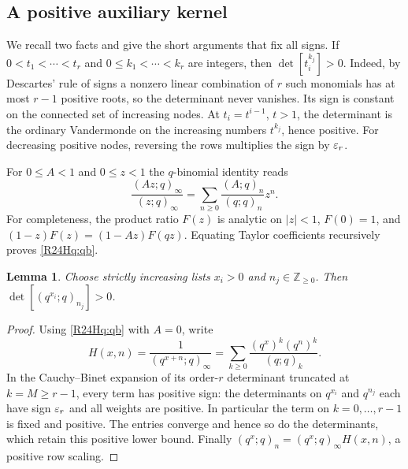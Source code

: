 \documentclass[11pt,a4paper]{article}
\newtheorem{SourceRceHqlemma}[SourceRceHqtheorem]{Lemma}
\begin{document}
\subsection{A positive auxiliary kernel}
We recall two facts and give the short arguments that fix all signs.
If $0<t_1<\cdots<t_r$ and $0\le k_1<\cdots<k_r$ are integers, then
$\det[t_i^{k_j}]>0$. Indeed, by Descartes' rule of signs a nonzero linear
combination of $r$ such monomials has at most $r-1$ positive roots, so
the determinant never vanishes. Its sign is constant on the connected
set of increasing nodes. At $t_i=t^{i-1}$, $t>1$, the determinant is the
ordinary Vandermonde on the increasing numbers $t^{k_j}$, hence positive.
For decreasing positive nodes, reversing the rows multiplies the sign by
$\varepsilon_r$.

For $0\le A<1$ and $0\le z<1$ the $q$-binomial identity reads
\begin{equation}\label{R24Hq:qb}
 \frac{(Az;q)_\infty}{(z;q)_\infty}
    =\sum_{n\ge0}\frac{(A;q)_n}{(q;q)_n}z^n .
\end{equation}
For completeness, the product ratio $F(z)$ is analytic on $|z|<1$,
$F(0)=1$, and $(1-z)F(z)=(1-Az)F(qz)$. Equating Taylor coefficients
recursively proves \eqref{R24Hq:qb}.

\begin{SourceRceHqlemma}\label{R24Hq:pos}
Choose strictly increasing lists $x_i>0$ and $n_j\in\mathbb Z_{\ge0}$. Then
$\det[(q^{x_i};q)_{n_j}]>0$.
\end{SourceRceHqlemma}
\begin{proof}
Using \eqref{R24Hq:qb} with $A=0$, write
\[
 H(x,n)=\frac{1}{(q^{x+n};q)_\infty}
 =\sum_{k\ge0}\frac{(q^x)^k(q^n)^k}{(q;q)_k}.
\]
In the Cauchy--Binet expansion of its order-$r$ determinant truncated at
$k=M\ge r-1$, every term has positive sign: the determinants on
$q^{x_i}$ and $q^{n_j}$ each have sign $\varepsilon_r$ and all weights are positive.
In particular the term on $k=0,\ldots,r-1$ is fixed and positive.
The entries converge and hence so do the determinants, which retain
this positive lower bound. Finally
$(q^x;q)_n=(q^x;q)_\infty H(x,n)$, a positive row scaling.
\end{proof}
\end{document}
